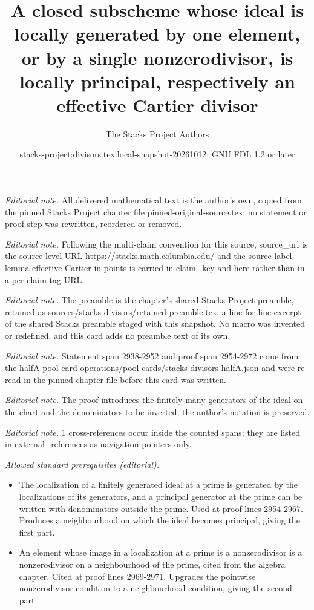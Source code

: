 \documentclass[10pt,a4paper]{amsart}
\title{A closed subscheme whose ideal is locally generated by one element, or by a single nonzerodivisor, is locally principal, respectively an effective Cartier divisor}
\author{The Stacks Project Authors}
\date{stacks-project:divisors.tex:local-snapshot-20261012; GNU FDL 1.2 or later}
\theoremstyle{plain}
\theoremstyle{definition}
\theoremstyle{remark}
\numberwithin{equation}{subsection}
\begin{document}
\maketitle
\noindent\textit{Editorial note.} All delivered mathematical text is the author's own, copied from the pinned Stacks Project chapter file pinned-original-source.tex; no statement or proof step was rewritten, reordered or removed.\par\medskip
\noindent\textit{Editorial note.} Following the multi-claim convention for this source, source\_url is the source-level URL https://stacks.math.columbia.edu/ and the source label lemma-effective-Cartier-in-points is carried in claim\_key and here rather than in a per-claim tag URL.\par\medskip
\noindent\textit{Editorial note.} The preamble is the chapter's shared Stacks Project preamble, retained as sources/stacks-divisors/retained-preamble.tex: a line-for-line excerpt of the shared Stacks preamble staged with this snapshot. No macro was invented or redefined, and this card adds no preamble text of its own.\par\medskip
\noindent\textit{Editorial note.} Statement span 2938-2952 and proof span 2954-2972 come from the halfA pool card operations/pool-cards/stacks-divisors-halfA.json and were re-read in the pinned chapter file before this card was written.\par\medskip
\noindent\textit{Editorial note.} The proof introduces the finitely many generators of the ideal on the chart and the denominators to be inverted; the author's notation is preserved.\par\medskip
\noindent\textit{Editorial note.} 1 cross-references occur inside the counted spans; they are listed in external\_references as navigation pointers only.\par\medskip
\noindent\textit{Allowed standard prerequisites (editorial).}\begin{itemize}
\item The localization of a finitely generated ideal at a prime is generated by the localizations of its generators, and a principal generator at the prime can be written with denominators outside the prime. Used at proof lines 2954-2967. Produces a neighbourhood on which the ideal becomes principal, giving the first part.
\item An element whose image in a localization at a prime is a nonzerodivisor is a nonzerodivisor on a neighbourhood of the prime, cited from the algebra chapter. Cited at proof lines 2969-2971. Upgrades the pointwise nonzerodivisor condition to a neighbourhood condition, giving the second part.
\end{itemize}\medskip
\end{document}
